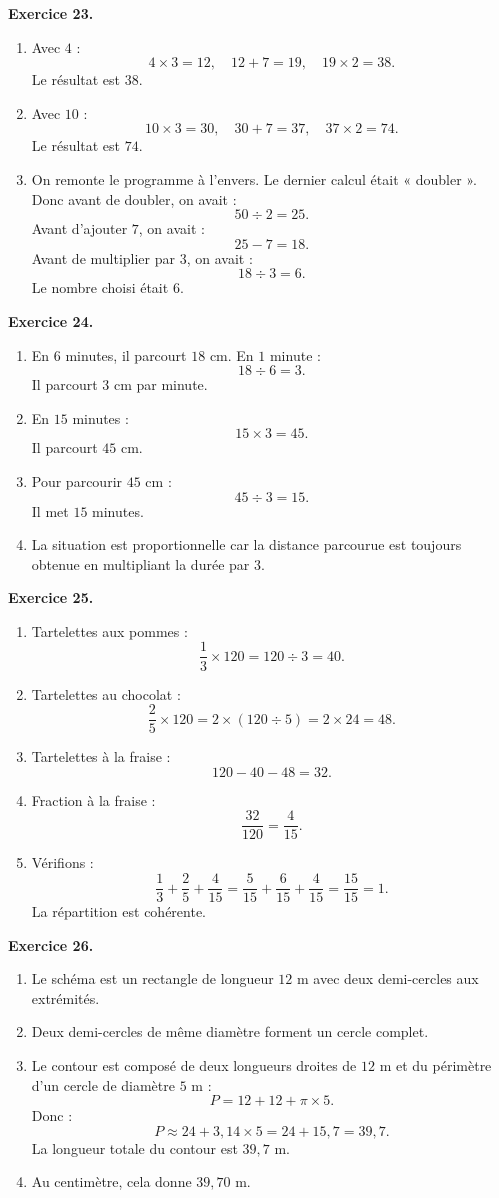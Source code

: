 \documentclass[11pt,a4paper]{article}
\newcommand{\corrige}[2]{
\begin{corrigebox}
\textbf{Exercice #1.}

#2
\end{corrigebox}
}
\begin{document}
\corrige{23}{
\begin{enumerate}[label=\alph*)]
\item Avec $4$ :
\[
4\times 3=12,
\quad
12+7=19,
\quad
19\times 2=38.
\]
Le résultat est $38$.
\item Avec $10$ :
\[
10\times 3=30,
\quad
30+7=37,
\quad
37\times 2=74.
\]
Le résultat est $74$.
\item On remonte le programme à l'envers.
Le dernier calcul était « doubler ». Donc avant de doubler, on avait :
\[
50\div 2=25.
\]
Avant d'ajouter $7$, on avait :
\[
25-7=18.
\]
Avant de multiplier par $3$, on avait :
\[
18\div 3=6.
\]
Le nombre choisi était $6$.
\end{enumerate}
}

\corrige{24}{
\begin{enumerate}[label=\arabic*)]
\item En $6$ minutes, il parcourt $18$ cm.
En $1$ minute :
\[
18\div 6=3.
\]
Il parcourt $3$ cm par minute.
\item En $15$ minutes :
\[
15\times 3=45.
\]
Il parcourt $45$ cm.
\item Pour parcourir $45$ cm :
\[
45\div 3=15.
\]
Il met $15$ minutes.
\item La situation est proportionnelle car la distance parcourue est toujours obtenue en multipliant la durée par $3$.
\end{enumerate}
}

\corrige{25}{
\begin{enumerate}[label=\arabic*)]
\item Tartelettes aux pommes :
\[
\frac{1}{3}\times 120=120\div 3=40.
\]
\item Tartelettes au chocolat :
\[
\frac{2}{5}\times 120=2\times(120\div 5)=2\times 24=48.
\]
\item Tartelettes à la fraise :
\[
120-40-48=32.
\]
\item Fraction à la fraise :
\[
\frac{32}{120}=\frac{4}{15}.
\]
\item Vérifions :
\[
\frac{1}{3}+\frac{2}{5}+\frac{4}{15}
=
\frac{5}{15}+\frac{6}{15}+\frac{4}{15}
=
\frac{15}{15}=1.
\]
La répartition est cohérente.
\end{enumerate}
}

\corrige{26}{
\begin{enumerate}[label=\arabic*)]
\item Le schéma est un rectangle de longueur $12$ m avec deux demi-cercles aux extrémités.
\item Deux demi-cercles de même diamètre forment un cercle complet.
\item Le contour est composé de deux longueurs droites de $12$ m et du périmètre d'un cercle de diamètre $5$ m :
\[
P=12+12+\pi\times 5.
\]
Donc :
\[
P\approx 24+3,14\times 5=24+15,7=39,7.
\]
La longueur totale du contour est $39,7$ m.
\item Au centimètre, cela donne $39,70$ m.
\end{enumerate}
}
\end{document}
